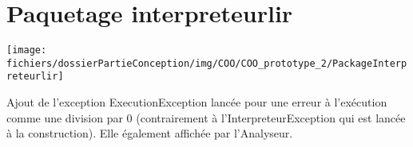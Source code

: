 \section{Paquetage interpreteurlir}
\begin{center}\texttt{[image: fichiers/dossierPartieConception/img/COO/COO\_prototype\_2/PackageInterpreteurlir]}\end{center}
\par Ajout de l'exception ExecutionException lancée pour une erreur à l'exécution comme une division par 0 (contrairement à l'InterpreteurException qui est lancée à la construction). Elle également affichée par l'Analyseur.